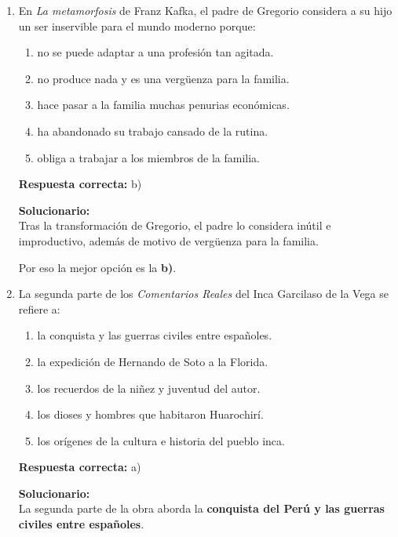 \begin{enumerate}

	
	\item En \textit{La metamorfosis} de Franz Kafka, el padre de Gregorio considera a su hijo un ser inservible para el mundo moderno porque:
	\begin{enumerate}[label=\alph*)]
		\item no se puede adaptar a una profesión tan agitada.
		\item no produce nada y es una vergüenza para la familia.
		\item hace pasar a la familia muchas penurias económicas.
		\item ha abandonado su trabajo cansado de la rutina.
		\item obliga a trabajar a los miembros de la familia.
	\end{enumerate}
	\textbf{Respuesta correcta:} b)
	
	\vspace{2mm}
	\textbf{Solucionario:}\\
	Tras la transformación de Gregorio, el padre lo considera inútil e improductivo, además de motivo de vergüenza para la familia.
	
	Por eso la mejor opción es la \textbf{b)}.
	

	
	\vspace{6mm}
	
	\item La segunda parte de los \textit{Comentarios Reales} del Inca Garcilaso de la Vega se refiere a:
	\begin{enumerate}[label=\alph*)]
		\item la conquista y las guerras civiles entre españoles.
		\item la expedición de Hernando de Soto a la Florida.
		\item los recuerdos de la niñez y juventud del autor.
		\item los dioses y hombres que habitaron Huarochirí.
		\item los orígenes de la cultura e historia del pueblo inca.
	\end{enumerate}
	\textbf{Respuesta correcta:} a)
	
	\vspace{2mm}
	\textbf{Solucionario:}\\
	La segunda parte de la obra aborda la \textbf{conquista del Perú y las guerras civiles entre españoles}.
	


\end{enumerate}
